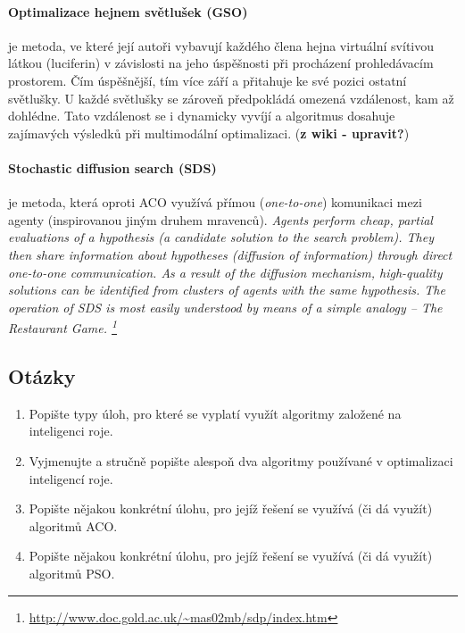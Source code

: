 \documentclass[a4paper,12pt]{article}
\begin{document}
\paragraph{Optimalizace hejnem světlušek (GSO)} {je metoda, ve které její autoři vybavují  každého člena hejna
virtuální svítivou látkou (luciferin) v závislosti na jeho úspěšnosti při procházení prohledávacím prostorem.
Čím úspěšnější, tím více září a přitahuje ke své pozici ostatní světlušky. U každé světlušky se zároveň
předpokládá omezená vzdálenost, kam až dohlédne. Tato vzdálenost se i dynamicky vyvíjí a algoritmus dosahuje
zajímavých výsledků při multimodální optimalizaci.} ({\bf z wiki - upravit?})

\paragraph{Stochastic diffusion search (SDS)} {je metoda, která oproti ACO využívá přímou ({\it one-to-one}) komunikaci
mezi agenty (inspirovanou jiným druhem mravenců). {\it Agents perform cheap, partial evaluations of a hypothesis (a candidate solution to the search problem). They then share information about hypotheses (diffusion of information) through direct one-to-one communication. As a result of the diffusion mechanism, high-quality solutions can be identified from clusters of agents with the same hypothesis. The operation of SDS is most easily understood by means of a simple analogy – The Restaurant Game. \footnote{\url{http://www.doc.gold.ac.uk/~mas02mb/sdp/index.htm}}}}




\subsection{Otázky}
\begin{enumerate}
  \item Popište typy úloh, pro které se vyplatí využít algoritmy založené na inteligenci roje.
  \item Vyjmenujte a stručně popište alespoň dva algoritmy používané v optimalizaci inteligencí roje.
  \item Popište nějakou konkrétní úlohu, pro jejíž řešení se využívá (či dá využít) algoritmů ACO.
  \item Popište nějakou konkrétní úlohu, pro jejíž řešení se využívá (či dá využít) algoritmů PSO.
\end{enumerate}
\end{document}
